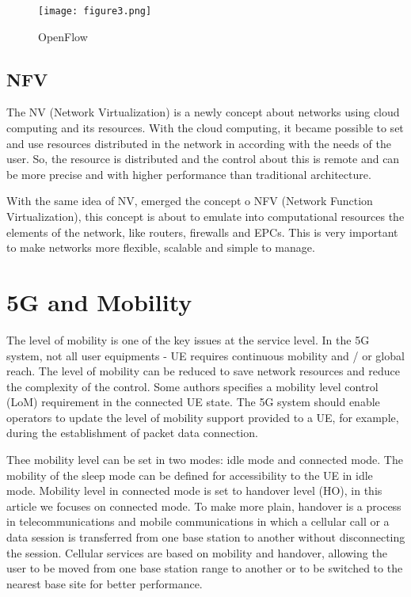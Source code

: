 \documentclass[12pt]{article}
\begin{document}
\begin{figure}[ht]
\centering
\texttt{[image: figure3.png]}
\caption{OpenFlow}
\label{figure 3: OpenFlow}
\end{figure}


\subsection{NFV}

The NV (Network Virtualization) is a newly concept about networks using cloud computing and its resources. With the cloud computing, it became possible to set and use resources distributed in the network in according with the needs of the user. So, the resource is distributed and the control about this is remote and can be more precise and with higher performance than traditional architecture.

With the same idea of NV, emerged the concept o NFV (Network Function Virtualization), this concept is about to emulate into computational resources the elements of the network, like routers, firewalls and EPCs. This is very important to make networks more flexible, scalable and simple to manage.


\section{5G and Mobility}

The level of mobility is one of the key issues at the service level. In the 5G system, not all user equipments - UE requires continuous mobility and / or global reach. The level of mobility can be reduced to save network resources and reduce the complexity of the control. Some authors specifies a mobility level control (LoM) requirement in the connected UE state. The 5G system should enable operators to update the level of mobility support provided to a UE, for example, during the establishment of packet data connection.

Thee mobility level can be set in two modes: idle mode and connected mode. The mobility of the sleep mode can be defined for accessibility to the UE in idle mode. Mobility level in connected mode is set to handover level (HO), in this article we focuses on connected mode. To make more plain, handover is a process in telecommunications and mobile communications in which a cellular call or a data session is transferred from one base station to another without disconnecting the session. Cellular services are based on mobility and handover, allowing the user to be moved from one base station range to another or to be switched to the nearest base site for better performance.
\end{document}
